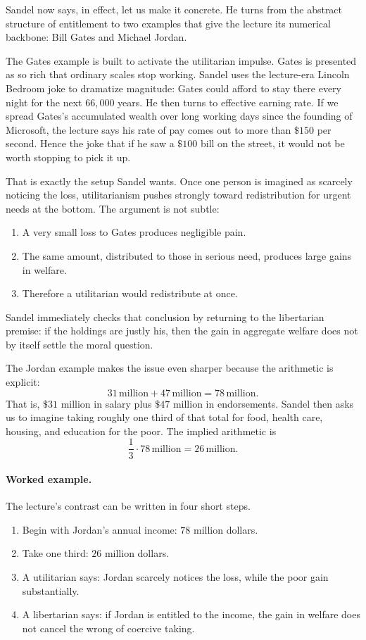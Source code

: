 Sandel now says, in effect, let us make it concrete. He turns from the abstract structure of entitlement to two examples that give the lecture its numerical backbone: Bill Gates and Michael Jordan.

The Gates example is built to activate the utilitarian impulse. Gates is presented as so rich that ordinary scales stop working. Sandel uses the lecture-era Lincoln Bedroom joke to dramatize magnitude: Gates could afford to stay there every night for the next \(66{,}000\) years. He then turns to effective earning rate. If we spread Gates's accumulated wealth over long working days since the founding of Microsoft, the lecture says his rate of pay comes out to more than \(\$150\) per second. Hence the joke that if he saw a \(\$100\) bill on the street, it would not be worth stopping to pick it up.

That is exactly the setup Sandel wants. Once one person is imagined as scarcely noticing the loss, utilitarianism pushes strongly toward redistribution for urgent needs at the bottom. The argument is not subtle:
\begin{enumerate}
\item A very small loss to Gates produces negligible pain.
\item The same amount, distributed to those in serious need, produces large gains in welfare.
\item Therefore a utilitarian would redistribute at once.
\end{enumerate}
Sandel immediately checks that conclusion by returning to the libertarian premise: if the holdings are justly his, then the gain in aggregate welfare does not by itself settle the moral question.

The Jordan example makes the issue even sharper because the arithmetic is explicit:
\begin{equation}
31\,\text{million}+47\,\text{million}=78\,\text{million}.
\end{equation}
That is, \(\$31\) million in salary plus \(\$47\) million in endorsements. Sandel then asks us to imagine taking roughly one third of that total for food, health care, housing, and education for the poor. The implied arithmetic is
\begin{equation}
\frac{1}{3}\cdot 78\,\text{million}=26\,\text{million}.
\end{equation}

\paragraph{Worked example.}
The lecture's contrast can be written in four short steps.
\begin{enumerate}
\item Begin with Jordan's annual income: \(78\) million dollars.
\item Take one third: \(26\) million dollars.
\item A utilitarian says: Jordan scarcely notices the loss, while the poor gain substantially.
\item A libertarian says: if Jordan is entitled to the income, the gain in welfare does not cancel the wrong of coercive taking.
\end{enumerate}

